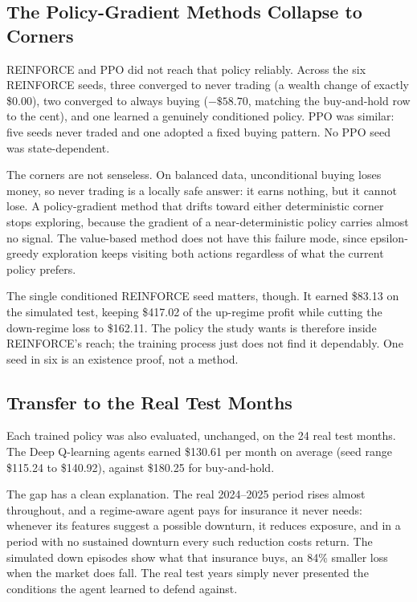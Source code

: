 \subsection{The Policy-Gradient Methods Collapse to Corners}

REINFORCE and PPO did not reach that policy reliably. Across the six
REINFORCE seeds, three converged to never trading (a wealth change of
exactly \$0.00), two converged to always buying (\(-\$58.70\), matching
the buy-and-hold row to the cent), and one learned a genuinely
conditioned policy. PPO was similar: five seeds never traded and one
adopted a fixed buying pattern. No PPO seed was state-dependent.

The corners are not senseless. On balanced data, unconditional buying
loses money, so never trading is a locally safe answer: it earns
nothing, but it cannot lose. A policy-gradient method that drifts toward
either deterministic corner stops exploring, because the gradient of a
near-deterministic policy carries almost no signal. The value-based
method does not have this failure mode, since epsilon-greedy exploration
keeps visiting both actions regardless of what the current policy
prefers.

The single conditioned REINFORCE seed matters, though. It earned
\$83.13 on the simulated test, keeping \$417.02 of the up-regime profit
while cutting the down-regime loss to \$162.11. The policy the study
wants is therefore inside REINFORCE's reach; the training process just
does not find it dependably. One seed in six is an existence proof, not
a method.

\subsection{Transfer to the Real Test Months}

Each trained policy was also evaluated, unchanged, on the 24 real test
months. The Deep Q-learning agents earned \$130.61 per month on average
(seed range \$115.24 to \$140.92), against \$180.25 for buy-and-hold.

The gap has a clean explanation. The real 2024--2025 period rises almost
throughout, and a regime-aware agent pays for insurance it never needs:
whenever its features suggest a possible downturn, it reduces exposure,
and in a period with no sustained downturn every such reduction costs
return. The simulated down episodes show what that insurance buys, an
84\% smaller loss when the market does fall. The real test years simply
never presented the conditions the agent learned to defend against.

